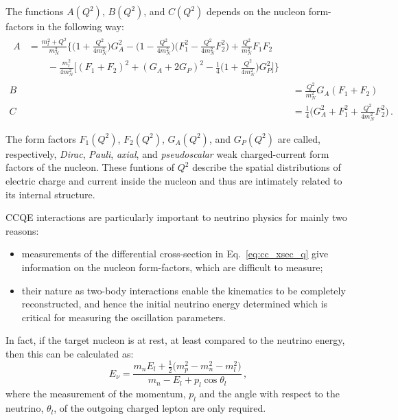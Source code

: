 The functions $A(Q^2)$, $B(Q^2)$, and $C(Q^2)$ depends on the nucleon form-factors in the following way:
\begin{align}
	\begin{split}
		\label{eq:A(Q)}
		A &= \frac{m_l^2+Q^2}{m_N^2} \bigg\{ \bigg(1+\frac{Q^2}{4m_N^2}\bigg) G_A^2 - \bigg(1-\frac{Q^2}{4m_N^2}\bigg) %
		\bigg(F_1^2 - \frac{Q^2}{4m_N^2}F_2^2 \bigg) +\frac{Q^2}{m_N^2} F_1 F_2 \\
		&\qquad- \frac{m_l^2}{4m_N^2} %
		\bigg[ (F_1+F_2)^2+(G_A+2G_P)^2-\frac{1}{4}\bigg(1+\frac{Q^2}{4m_N^2}\bigg) G_P^2 \bigg] \bigg\}\, 
	\end{split}\\
	\label{eq:B(Q)}
	B &= \frac{Q^2}{m_N^2} G_A (F_1+F_2)\,\\
	\label{eq:C(Q)}
	C &= \frac{1}{4} \big (G_A^2 +F_1^2+\frac{Q^2}{4m_N^2}F_2^2\big)\,.
\end{align}

The form factors $F_1(Q^2)$, $F_2(Q^2)$, $G_A(Q^2)$, and $G_P(Q^2)$ are called, respectively, \emph{Dirac}, %
\emph{Pauli}, \emph{axial}, and \emph{pseudoscalar} weak charged-current form factors of the nucleon.
These funtions of $Q^2$ describe the spatial distributions of electric charge and current inside the nucleon %
and thus are intimately related to its internal structure.

CCQE interactions are particularly important to neutrino physics for mainly two reasons:
\begin{itemize}
	\item measurements of the differential cross-section in Eq.~\ref{eq:cc_xsec_q} give information on the %
		nucleon form-factors, which are difficult to measure; 
	\item their nature as two-body interactions enable the kinematics to be completely reconstructed, %
		and hence the initial neutrino energy determined which is critical for measuring the oscillation parameters.
\end{itemize}

In fact, if the target nucleon is at rest, at least compared to the neutrino energy, %
then this can be calculated as:
\begin{equation}
	E_\nu = \frac{m_n E_l + \frac{1}{2}\big ( m_p^2-m_n^2-m_l^2)}{m_n - E_l+p_l \cos \theta_l}\,,
\end{equation}
where the measurement of the momentum, $p_l$ and the angle with respect to the neutrino, $\theta_l$, of the %
outgoing charged lepton are only required.

